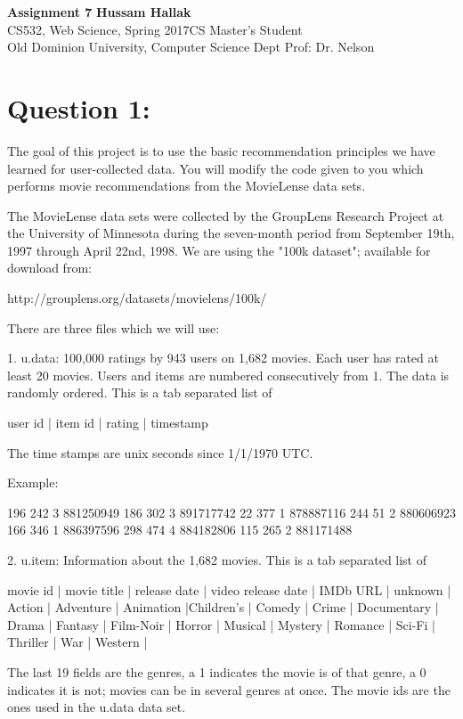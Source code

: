 \documentclass[a4paper, 11pt]{article}
\begin{document}
\noindent
\large\textbf{Assignment 7} \hfill \textbf{Hussam Hallak} \\
\normalsize CS532, Web Science, Spring 2017\hfill CS Master's Student \\
Old Dominion University, Computer Science Dept \hfill Prof: Dr. Nelson 

\section*{Question 1:}
The goal of this project is to use the basic recommendation principles
we have learned for user-collected data. You will modify the code
given to you which performs movie recommendations from the MovieLense
data sets.

The MovieLense data sets were collected by the GroupLens Research
Project at the University of Minnesota during the seven-month period
from September 19th, 1997 through April 22nd, 1998.  We are using the 
"100k dataset"; available for download from:

http://grouplens.org/datasets/movielens/100k/

There are three files which we will use:

1.  u.data: 100,000 ratings by 943 users on 1,682 movies. Each
user has rated at least 20 movies. Users and items are numbered
consecutively from 1. The data is randomly ordered. This is a tab
separated list of 

user id | item id | rating | timestamp

The time stamps are unix seconds since 1/1/1970 UTC.

Example:

196     242     3       881250949
186     302     3       891717742
22      377     1       878887116
244     51      2       880606923
166     346     1       886397596
298     474     4       884182806
115     265     2       881171488

2.  u.item: Information about the 1,682 movies. This is a tab
separated list of

movie id | movie title | release date | video release date | IMDb URL | unknown | Action | Adventure | Animation |Children's | Comedy | Crime | Documentary | Drama | Fantasy | Film-Noir | Horror | Musical | Mystery | Romance | Sci-Fi | Thriller | War | Western |

The last 19 fields are the genres, a 1 indicates the movie is of
that genre, a 0 indicates it is not; movies can be in several genres
at once. The movie ids are the ones used in the u.data data set.
\end{document}
